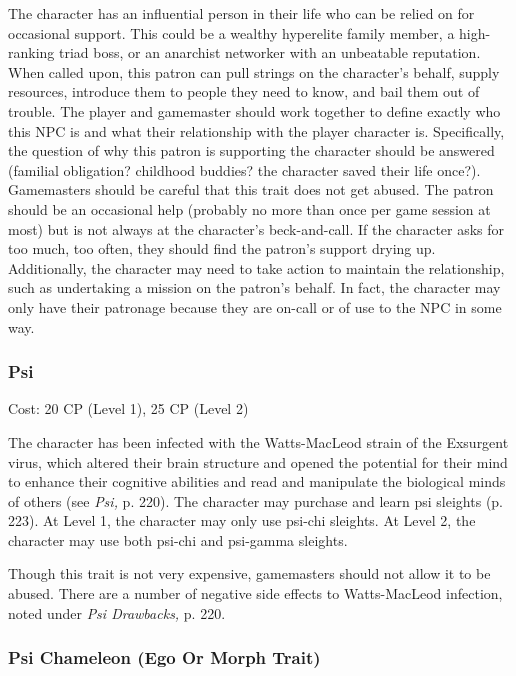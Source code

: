 The character has an influential person in their 
life who can be relied on for occasional support. 
This could be a wealthy hyperelite family member, a 
high-ranking triad boss, or an anarchist networker 
with an unbeatable reputation. When called upon, 
this patron can pull strings on the character's behalf, 
supply resources, introduce them to people they need 
to know, and bail them out of trouble. The player 
and gamemaster should work together to define exactly
who this NPC is and what their relationship
with the player character is. Specifically, the question 
of why this patron is supporting the character should 
be answered (familial obligation? childhood buddies? 
the character saved their life once?). Gamemasters 
should be careful that this trait does not get abused. 
The patron should be an occasional help (probably 
no more than once per game session at most) but is 
not always at the character's beck-and-call. If the 
character asks for too much, too often, they should 
find the patron's support drying up. Additionally, the 
character may need to take action to maintain the 
relationship, such as undertaking a mission on the 
patron's behalf. In fact, the character may only have 
their patronage because they are on-call or of use to 
the NPC in some way.

\subsubsection{Psi}

Cost: 20 CP (Level 1), 25 CP (Level 2) 

The character has been infected with the Watts-MacLeod
strain of the Exsurgent virus, which altered
their brain structure and opened the potential for their 
mind to enhance their cognitive abilities and read and 
manipulate the biological minds of others (see \textit{Psi,} 
p. 220). The character may purchase and learn psi 
sleights (p. 223). At Level 1, the character may only 
use psi-chi sleights. At Level 2, the character may use 
both psi-chi and psi-gamma sleights. 

Though this trait is not very expensive, gamemasters
should not allow it to be abused. There are a
number of negative side effects to Watts-MacLeod 
infection, noted under \textit{Psi Drawbacks, }p. 220.

\subsubsection{Psi Chameleon (Ego Or Morph Trait)}

